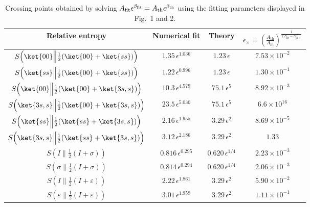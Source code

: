 \documentclass[11pt]{article}
\newcommand{\lb}{\left(}
\newcommand{\rb}{\right)}
\begin{document}
\begin{table}[ht]
\centering
\renewcommand{\arraystretch}{1.35}
\begin{tabular}{|c|c|c|c|}
\hline
Relative entropy &
Numerical fit &
Theory &
$\epsilon_\times = \lb\frac{A_{\text{th}}}{A_{\text{fit}}}\rb^{\frac{1}{(\beta_{\text{fit} }- \beta_{\text{th}})}}$
\\
\hline

$S\!\left(\ket{00}\Big\|\frac12(\ket{00}+\ket{ss})\right)$
&
$1.35\,\epsilon^{1.036}$
&
$1.23\,\epsilon$
&
$7.53\times10^{-2}$
\\
\hline

$S\!\left(\ket{ss}\Big\|\frac12(\ket{00}+\ket{ss})\right)$
&
$1.22\,\epsilon^{0.996}$
&
$1.23\,\epsilon$
&
$1.30\times10^{-1}$
\\
\hline

$S\!\left(\ket{00}\Big\|\frac12(\ket{00}+\ket{3s,s})\right)$
&
$10.3\,\epsilon^{4.579}$
&
$75.1\,\epsilon^{5}$
&
$8.92\times10^{-3}$
\\
\hline

$S\!\left(\ket{3s,s}\Big\|\frac12(\ket{00}+\ket{3s,s})\right)$
&
$23.5\,\epsilon^{5.030}$
&
$75.1\,\epsilon^{5}$
&
$6.6\times10^{16}$
\\
\hline

$S\!\left(\ket{ss}\Big\|\frac12(\ket{ss}+\ket{3s,s})\right)$
&
$2.16\,\epsilon^{1.955}$
&
$3.29\,\epsilon^{2}$
&
$8.69\times10^{-5}$
\\
\hline

$S\!\left(\ket{3s,s}\Big\|\frac12(\ket{ss}+\ket{3s,s})\right)$
&
$3.12\,\epsilon^{2.186}$
&
$3.29\,\epsilon^{2}$
&
$1.33$
\\
\hline

$S\!\left(I\Big\|\frac12(I+\sigma)\right)$
&
$0.816\,\epsilon^{0.295}$
&
$0.620\,\epsilon^{1/4}$
&
$2.23\times10^{-3}$
\\
\hline

$S\!\left(\sigma\Big\|\frac12(I+\sigma)\right)$
&
$0.814\,\epsilon^{0.294}$
&
$0.620\,\epsilon^{1/4}$
&
$2.06\times10^{-3}$
\\
\hline

$S\!\left(I\Big\|\frac12(I+\varepsilon)\right)$
&
$2.22\,\epsilon^{1.861}$
&
$3.29\,\epsilon^{2}$
&
$5.90\times10^{-2}$
\\
\hline

$S\!\left(\varepsilon\Big\|\frac12(I+\varepsilon)\right)$
&
$3.01\,\epsilon^{1.959}$
&
$3.29\,\epsilon^{2}$
&
$1.11\times10^{-1}$
\\
\hline

\end{tabular}
\caption{Crossing points obtained by solving
$A_{\rm fit}\epsilon^{\beta_{\rm fit}}
=
A_{\rm th}\epsilon^{\beta_{\rm th}}$
using the fitting parameters displayed in Fig.~1 and 2. }
\end{table}
\end{document}
